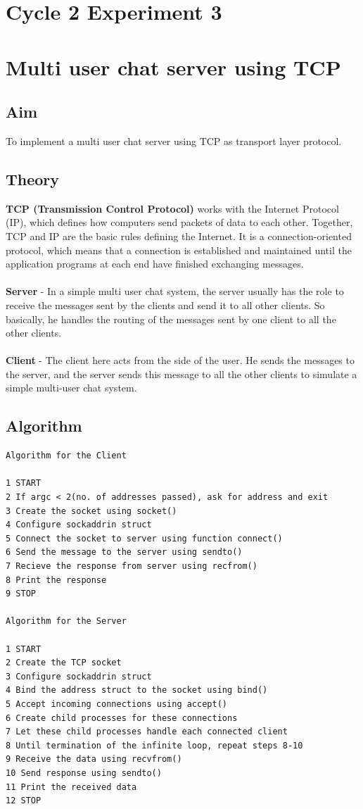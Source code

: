 \section*{Cycle 2 Experiment 3}

\section{\Large{Multi user chat server using TCP}}

\subsection{Aim}
\large To implement a multi user chat server using TCP as transport layer protocol.

\subsection{Theory}
\textbf{TCP (Transmission Control Protocol)} works with the Internet Protocol (IP), which defines how computers send packets of data to each other. Together, TCP and IP are the basic rules defining the Internet. It is a connection-oriented protocol, which means that a connection is established and maintained until the application programs at each end have finished exchanging messages.\\
\\
\textbf{Server} - In a simple multi user chat system, the server usually has the role to receive the messages sent by the clients and send it to all other clients. So basically, he handles the routing of the messages sent by one client to all the other clients.\\
\\
\textbf{Client} - The client here acts from the side of the user. He sends the messages to the server, and the server sends this message to all the other clients to simulate a simple multi-user chat system.

\subsection{Algorithm}
\begin{verbatim}
Algorithm for the Client

1 START
2 If argc < 2(no. of addresses passed), ask for address and exit
3 Create the socket using socket()
4 Configure sockaddrin struct
5 Connect the socket to server using function connect()
6 Send the message to the server using sendto()
7 Recieve the response from server using recfrom()
8 Print the response
9 STOP

Algorithm for the Server

1 START
2 Create the TCP socket 
3 Configure sockaddrin struct
4 Bind the address struct to the socket using bind()
5 Accept incoming connections using accept()
6 Create child processes for these connections
7 Let these child processes handle each connected client
8 Until termination of the infinite loop, repeat steps 8-10
9 Receive the data using recvfrom()
10 Send response using sendto()
11 Print the received data
12 STOP
\end{verbatim}

